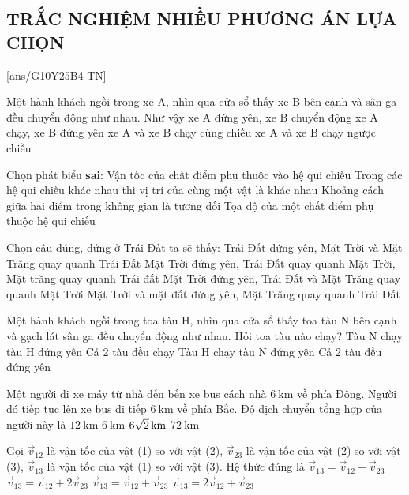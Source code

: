 \subsection{TRẮC NGHIỆM NHIỀU PHƯƠNG ÁN LỰA CHỌN}
\setcounter{ex}{0}
[ans/G10Y25B4-TN]
\begin{ex}
	Một hành khách ngồi trong xe A, nhìn qua cửa sổ thấy xe B bên cạnh và sân ga đều chuyển động như nhau. Như vậy
	\choice
	{xe A đứng yên, xe B chuyển động}
	{\True xe A chạy, xe B đứng yên}
	{xe A và xe B chạy cùng chiều}
	{xe A và xe B chạy ngược chiều}
	\loigiai{
	}
\end{ex}
\begin{ex}
	Chọn phát biểu \textbf{sai}:
	\choice
	{Vận tốc của chất điểm phụ thuộc vào hệ qui chiếu}
	{Trong các hệ qui chiếu khác nhau thì vị trí của cùng một vật là khác nhau}
	{\True Khoảng cách giữa hai điểm trong không gian là tương đối}
	{Tọa độ của một chất điểm phụ thuộc hệ qui chiếu}
\end{ex}
\begin{ex}
	Chọn câu đúng, đứng ở Trái Đất ta sẽ thấy:
	\choice
	{\True Trái Đất đứng yên, Mặt Trời và Mặt Trăng quay quanh Trái Đất}
	{Mặt Trời đứng yên, Trái Đất quay quanh Mặt Trời, Mặt trăng quay quanh Trái đất}
	{Mặt Trời đứng yên, Trái Đất và Mặt Trăng quay quanh Mặt Trời}
	{Mặt Trời và mặt đất đứng yên, Mặt Trăng quay quanh Trái Đất}
	\loigiai{
	}
\end{ex}
\begin{ex}
	Một hành khách ngồi trong toa tàu H, nhìn qua cửa sổ thấy toa tàu N bên cạnh và gạch lát sân ga đều chuyển động như nhau. Hỏi toa tàu nào chạy?
	\choice
	{Tàu N chạy tàu H đứng yên}
	{Cả 2 tàu đều chạy}
	{\True Tàu H chạy tàu N đứng yên}
	{Cả 2 tàu đều đứng yên}
	\loigiai{
	}
\end{ex}

\begin{ex}
	Một người đi xe máy từ nhà đến bến xe bus cách nhà $\SI{6}{\kilo\meter}$ về phía Đông. Người đó tiếp tục lên xe bus đi tiếp $\SI{6}{\kilo\meter}$ về phía Bắc. Độ dịch chuyển tổng hợp của người này là	
	\choice
	{$\SI{12}{\kilo\meter}$}
	{$\SI{6}{\kilo\meter}$}
	{\True $\xsi{6\sqrt{2}}{\kilo\meter}$}
	{$\SI{72}{\kilo\meter}$}
	\loigiai{}
\end{ex}
\begin{ex}
	Gọi $\vec{v}_{12}$ là vận tốc của vật (1) so với vật (2), $\vec{v}_{23}$ là vận tốc của vật (2) so với vật (3), $\vec{v}_{13}$ là vận tốc của vật (1) so với vật (3). Hệ thức đúng là
	\choice
	{$\vec{v}_{13}=\vec{v}_{12}-\vec{v}_{23}$}
	{$\vec{v}_{13}=\vec{v}_{12}+2\vec{v}_{23}$}
	{\True $\vec{v}_{13}=\vec{v}_{12}+\vec{v}_{23}$}
	{$\vec{v}_{13}=2\vec{v}_{12}+\vec{v}_{23}$}
	\loigiai{}
\end{ex}

